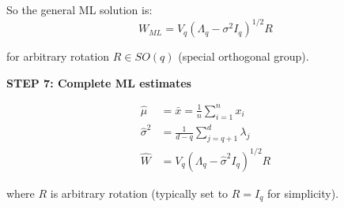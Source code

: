\documentclass[12pt]{article}
\begin{document}
\begin{solution}
So the general ML solution is:
\[
\boxed{W_{ML} = V_q(\Lambda_q - \sigma^2 I_q)^{1/2}R}
\]

for arbitrary rotation $R \in SO(q)$ (special orthogonal group).

\textbf{STEP 7: Complete ML estimates}

\begin{align*}
\hat{\mu} &= \bar{x} = \frac{1}{n}\sum_{i=1}^n x_i \\
\hat{\sigma}^2 &= \frac{1}{d-q}\sum_{j=q+1}^d \lambda_j \\
\hat{W} &= V_q(\Lambda_q - \hat{\sigma}^2 I_q)^{1/2}R
\end{align*}

where $R$ is arbitrary rotation (typically set to $R = I_q$ for simplicity).

\end{solution}
\end{document}
